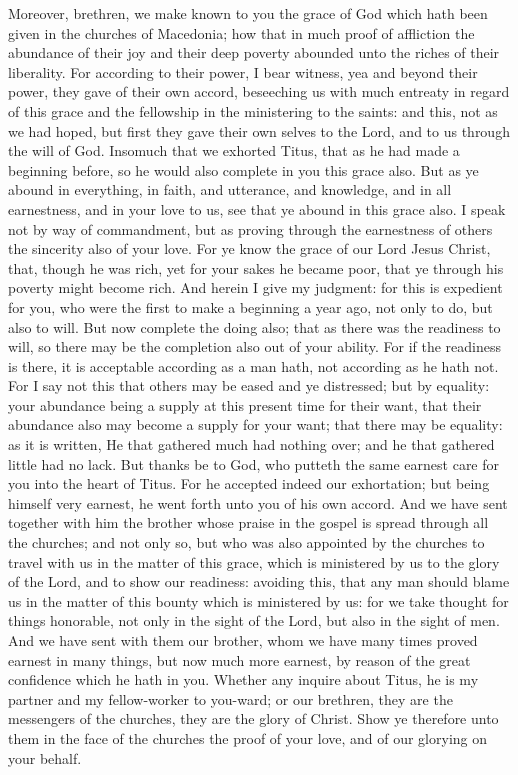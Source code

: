 Moreover, brethren, we make known to you the grace of God which hath been given in the churches of Macedonia; how that in much proof of affliction the abundance of their joy and their deep poverty abounded unto the riches of their liberality. For according to their power, I bear witness, yea and beyond their power, they gave of their own accord, beseeching us with much entreaty in regard of this grace and the fellowship in the ministering to the saints: and this, not as we had hoped, but first they gave their own selves to the Lord, and to us through the will of God. Insomuch that we exhorted Titus, that as he had made a beginning before, so he would also complete in you this grace also. But as ye abound in everything, in faith, and utterance, and knowledge, and in all earnestness, and in your love to us, see that ye abound in this grace also. I speak not by way of commandment, but as proving through the earnestness of others the sincerity also of your love. For ye know the grace of our Lord Jesus Christ, that, though he was rich, yet for your sakes he became poor, that ye through his poverty might become rich. And herein I give my judgment: for this is expedient for you, who were the first to make a beginning a year ago, not only to do, but also to will. But now complete the doing also; that as there was the readiness to will, so there may be the completion also out of your ability. For if the readiness is there, it is acceptable according as a man hath, not according as he hath not. For I say not this that others may be eased and ye distressed; but by equality: your abundance being a supply at this present time for their want, that their abundance also may become a supply for your want; that there may be equality: as it is written, He that gathered much had nothing over; and he that gathered little had no lack.  But thanks be to God, who putteth the same earnest care for you into the heart of Titus. For he accepted indeed our exhortation; but being himself very earnest, he went forth unto you of his own accord. And we have sent together with him the brother whose praise in the gospel is spread through all the churches; and not only so, but who was also appointed by the churches to travel with us in the matter of this grace, which is ministered by us to the glory of the Lord, and to show our readiness: avoiding this, that any man should blame us in the matter of this bounty which is ministered by us: for we take thought for things honorable, not only in the sight of the Lord, but also in the sight of men. And we have sent with them our brother, whom we have many times proved earnest in many things, but now much more earnest, by reason of the great confidence which he hath in you. Whether any inquire about Titus, he is my partner and my fellow-worker to you-ward; or our brethren, they are the messengers of the churches, they are the glory of Christ. Show ye therefore unto them in the face of the churches the proof of your love, and of our glorying on your behalf. 

